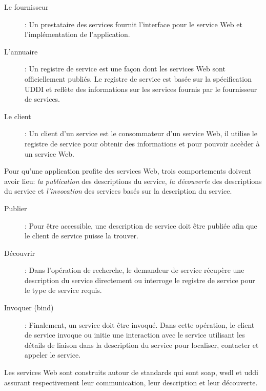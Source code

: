 

\renewcommand{\descriptionlabel}[1]{\hspace{1cm}\textbullet~\textsf{#1}}
\begin{description}
\item[Le fournisseur]: Un prestataire des services fournit l'interface
  pour le service Web et l'implémentation de l'application.
  
\item[L'annuaire]: Un registre de service est une façon dont les
  services Web sont officiellement publiés. Le registre de service est
  basée sur la spécification \textsc{UDDI} et reflète des informations
  sur les services fournis par le fournisseur de services.
  
\item[Le client]: Un client d'un service est le consommateur d'un
  service Web, il utilise le registre de service pour obtenir des
  informations et pour pouvoir accèder à un service Web.
\end{description}

Pour qu'une application profite des services Web, trois comportements
doivent avoir lieu: \textit{la publication} des descriptions du
service, \textit{la découverte} des descriptions du service et
\textit{l'invocation} des services basés sur la description du
service.

\renewcommand{\descriptionlabel}[1]{\hspace{1cm}\textbullet~\textsf{#1}}
\begin{description}
\item[Publier]: Pour être accessible, une description de service doit
  être publiée afin que le client de service puisse la
  trouver.

\item[Découvrir]: Dans l'opération de recherche, le demandeur de
  service récupère une description du service directement ou interroge
  le registre de service pour le type de service requis.

\item[Invoquer (bind)]: Finalement, un service doit être invoqué. Dans
  cette opération, le client de service invoque ou initie une
  interaction avec le service utilisant les détails de liaison dans la
  description du service pour localiser, contacter et appeler le
  service.
\end{description}

Les services Web sont construits autour de standards qui sont
\acrshort{soap}, \acrshort{wsdl} et \acrshort{uddi} assurant
respectivement leur communication, leur description et leur
découverte.

